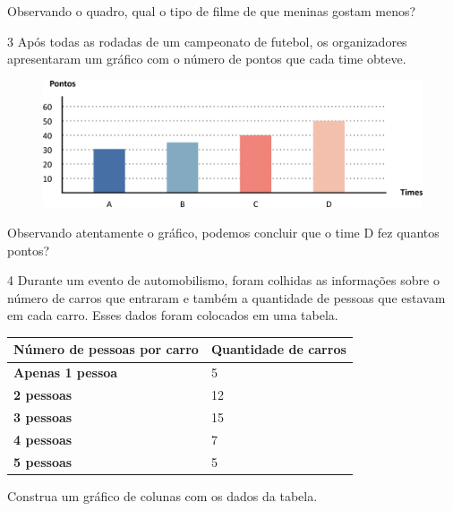 \noindent{}Observando o quadro, qual o tipo de filme de que meninas gostam menos? 


\num{3} Após todas as rodadas de um campeonato de futebol, os organizadores
apresentaram um gráfico com o número de pontos que cada
time obteve.

\begin{figure}[htpb!]
\centering
\includegraphics[width=\textwidth]{./media/image80.png}
\end{figure}

Observando atentamente o gráfico, podemos concluir que o time D fez quantos pontos?
\enlargethispage{2\baselineskip}


\num{4} Durante um evento de automobilismo, foram colhidas as informações sobre o número de carros
que entraram e também a quantidade de pessoas que estavam em cada carro.
Esses dados foram colocados em uma tabela.

\begin{longtable}[]{@{}ll@{}}
\toprule
\hline
\textbf{Número de pessoas por carro} & \textbf{Quantidade de carros}
\tabularnewline
\hline
\midrule
\endhead
\textbf{Apenas 1 pessoa} & 5\tabularnewline
\hline
\textbf{2 pessoas} & 12\tabularnewline
\hline
\textbf{3 pessoas} & 15\tabularnewline
\hline
\textbf{4 pessoas} & 7\tabularnewline
\hline
\textbf{5 pessoas} & 5\tabularnewline
\bottomrule
\end{longtable}

Construa um gráfico de colunas com os dados da tabela.

